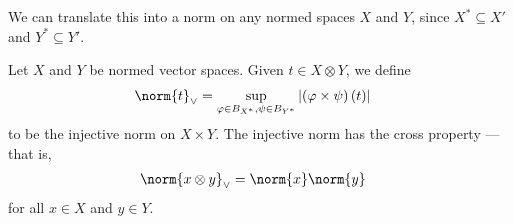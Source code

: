 \documentclass[10pt]{mypackage}
\begin{document}
We can translate this into a norm on any normed spaces $X$ and $Y$, since $X^{\ast}\subseteq X'$ and $Y^{\ast}\subseteq Y'$.
\begin{proposition}
  Let $X$ and $Y$ be normed vector spaces. Given $t\in X\otimes Y$, we define
  \begin{align*}
    \norm{t}_{\vee} &= \sup_{\varphi\in B_{X^{\ast}},\psi\in B_{Y^{\ast}}} \left\vert \left(\varphi\times\psi\right)\left(t\right) \right\vert
  \end{align*}
  to be the injective norm on $X\times Y$. The injective norm has the cross property --- that is,
  \begin{align*}
    \norm{x\otimes y}_{\vee} &= \norm{x}\norm{y}
  \end{align*}
  for all $x\in X$ and $y\in Y$.
\end{proposition}
\end{document}
